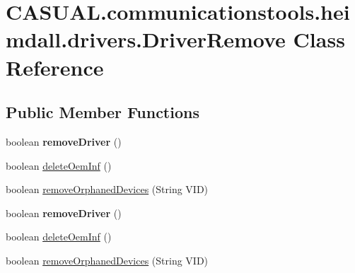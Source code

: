 \hypertarget{class_c_a_s_u_a_l_1_1communicationstools_1_1heimdall_1_1drivers_1_1_driver_remove}{\section{C\-A\-S\-U\-A\-L.\-communicationstools.\-heimdall.\-drivers.\-Driver\-Remove Class Reference}
\label{class_c_a_s_u_a_l_1_1communicationstools_1_1heimdall_1_1drivers_1_1_driver_remove}
}
\subsection*{Public Member Functions}
\begin{DoxyCompactItemize}
\item 
\hypertarget{class_c_a_s_u_a_l_1_1communicationstools_1_1heimdall_1_1drivers_1_1_driver_remove_a5cc93de9ad5be7cb5c4e5597ef47cdba}{boolean {\bfseries remove\-Driver} ()}\label{class_c_a_s_u_a_l_1_1communicationstools_1_1heimdall_1_1drivers_1_1_driver_remove_a5cc93de9ad5be7cb5c4e5597ef47cdba}

\item 
boolean \hyperlink{class_c_a_s_u_a_l_1_1communicationstools_1_1heimdall_1_1drivers_1_1_driver_remove_a5abbba023d73c60d3d4c73f37dab8433}{delete\-Oem\-Inf} ()
\item 
boolean \hyperlink{class_c_a_s_u_a_l_1_1communicationstools_1_1heimdall_1_1drivers_1_1_driver_remove_a7a5d3af216c01ae5f0b71aa40796780d}{remove\-Orphaned\-Devices} (String V\-I\-D)
\item 
\hypertarget{class_c_a_s_u_a_l_1_1communicationstools_1_1heimdall_1_1drivers_1_1_driver_remove_a5cc93de9ad5be7cb5c4e5597ef47cdba}{boolean {\bfseries remove\-Driver} ()}\label{class_c_a_s_u_a_l_1_1communicationstools_1_1heimdall_1_1drivers_1_1_driver_remove_a5cc93de9ad5be7cb5c4e5597ef47cdba}

\item 
boolean \hyperlink{class_c_a_s_u_a_l_1_1communicationstools_1_1heimdall_1_1drivers_1_1_driver_remove_a5abbba023d73c60d3d4c73f37dab8433}{delete\-Oem\-Inf} ()
\item 
boolean \hyperlink{class_c_a_s_u_a_l_1_1communicationstools_1_1heimdall_1_1drivers_1_1_driver_remove_a7a5d3af216c01ae5f0b71aa40796780d}{remove\-Orphaned\-Devices} (String V\-I\-D)
\end{DoxyCompactItemize}


